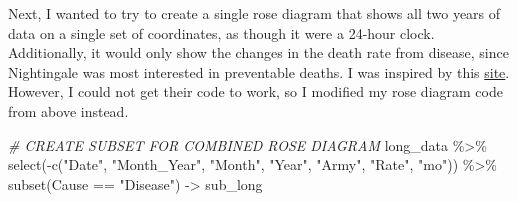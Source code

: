 \documentclass[
  dvipsnames]{article}
\newenvironment{Shaded}{\begin{snugshade}}{\end{snugshade}}
\newcommand{\CommentTok}[1]{\textcolor[rgb]{0.56,0.35,0.01}{\textit{#1}}}
\newcommand{\FunctionTok}[1]{\textcolor[rgb]{0.00,0.00,0.00}{#1}}
\newcommand{\NormalTok}[1]{#1}
\newcommand{\OtherTok}[1]{\textcolor[rgb]{0.56,0.35,0.01}{#1}}
\newcommand{\SpecialCharTok}[1]{\textcolor[rgb]{0.00,0.00,0.00}{#1}}
\newcommand{\StringTok}[1]{\textcolor[rgb]{0.31,0.60,0.02}{#1}}
\begin{document}
Next, I wanted to try to create a single rose diagram that shows all two
years of data on a single set of coordinates, as though it were a
24-hour clock. Additionally, it would only show the changes in the death
rate from disease, since Nightingale was most interested in preventable
deaths. I was inspired by this
\href{https://www.r-bloggers.com/2013/01/going-beyond-florence-nightingales-data-diagram-did-flo-blow-it-with-wedges/}{site}.
However, I could not get their code to work, so I modified my rose
diagram code from above instead.

\begin{Shaded}
\begin{Highlighting}[]
\CommentTok{\# CREATE SUBSET FOR COMBINED ROSE DIAGRAM}
\NormalTok{long\_data }\SpecialCharTok{\%\textgreater{}\%}
    \FunctionTok{select}\NormalTok{(}\SpecialCharTok{{-}}\FunctionTok{c}\NormalTok{(}\StringTok{"Date"}\NormalTok{, }\StringTok{"Month\_Year"}\NormalTok{, }\StringTok{"Month"}\NormalTok{, }\StringTok{"Year"}\NormalTok{,}
        \StringTok{"Army"}\NormalTok{, }\StringTok{"Rate"}\NormalTok{, }\StringTok{"mo"}\NormalTok{)) }\SpecialCharTok{\%\textgreater{}\%}
    \FunctionTok{subset}\NormalTok{(Cause }\SpecialCharTok{==} \StringTok{"Disease"}\NormalTok{) }\OtherTok{{-}\textgreater{}}\NormalTok{ sub\_long}
\end{Highlighting}
\end{Shaded}
\end{document}
